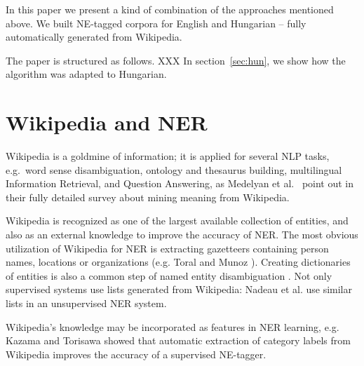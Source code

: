 \documentclass[11pt]{article}
\begin{document}


In this paper we present a kind of combination of the approaches mentioned above. We built NE-tagged corpora for English and Hungarian -- fully automatically generated from Wikipedia. %

The paper is structured as follows. XXX In section~\ref{sec:hun}, we show how the algorithm was adapted to Hungarian.


\section{Wikipedia and NER}

Wikipedia is a goldmine of information; it is applied for several NLP tasks, e.g.~word sense disambiguation, ontology and thesaurus building, multilingual Information Retrieval, and Question Answering, as Medelyan et al.~ point out in their fully detailed survey about mining meaning from Wikipedia. 

Wikipedia is recognized as one of the largest available collection of entities, and also as an external knowledge to improve the accuracy of NER. The most obvious utilization of Wikipedia for NER is extracting gazetteers containing person names, locations or organizations (e.g. Toral and Munoz ). Creating dictionaries of entities is also a common step of named entity disambiguation \cite{Bunescu:06,Cucerzan:07}. Not only supervised systems use lists generated from Wikipedia: Nadeau et al.  use similar lists in an unsupervised NER system. 

Wikipedia's knowledge may be incorporated as features in NER learning, e.g. Kazama and Torisawa  showed that automatic extraction of category labels from Wikipedia improves the accuracy of a supervised NE-tagger. 
\end{document}
